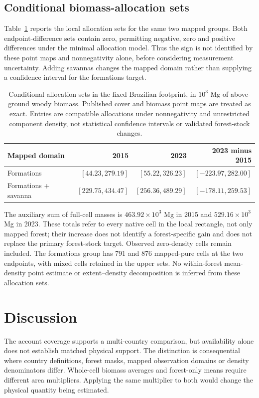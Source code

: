\documentclass[11pt,a4paper]{article}
\begin{document}
\subsection{Conditional biomass-allocation sets}
Table~\ref{tab:allocation} reports the local allocation sets for the same two mapped groups. Both endpoint-difference sets contain zero, permitting negative, zero and positive differences under the minimal allocation model. Thus the sign is not identified by these point maps and nonnegativity alone, before considering measurement uncertainty. Adding savannas changes the mapped domain rather than supplying a confidence interval for the formations target.

\begin{table}[htbp]
\centering\small
\caption{Conditional allocation sets in the fixed Brazilian footprint, in $10^3$ Mg of above-ground woody biomass. Published cover and biomass point maps are treated as exact. Entries are compatible allocations under nonnegativity and unrestricted component density, not statistical confidence intervals or validated forest-stock changes.}\label{tab:allocation}
\begin{tabular}{lrrr}
\toprule
Mapped domain & 2015 & 2023 & 2023 minus 2015\\\midrule
Formations & $[44.23, 279.19]$ & $[55.22, 326.23]$ & $[-223.97, 282.00]$ \\
Formations + savanna & $[229.75, 434.47]$ & $[256.36, 489.29]$ & $[-178.11, 259.53]$ \\
\bottomrule
\end{tabular}
\end{table}

The auxiliary sum of full-cell masses is $463.92\times10^3$ Mg in 2015 and $529.16\times10^3$ Mg in 2023. These totals refer to every native cell in the local rectangle, not only mapped forest; their increase does not identify a forest-specific gain and does not replace the primary forest-stock target. Observed zero-density cells remain included. The formations group has 791 and 876 mapped-pure cells at the two endpoints, with mixed cells retained in the upper sets. No within-forest mean-density point estimate or extent--density decomposition is inferred from these allocation sets.

\section{Discussion}
The account coverage supports a multi-country comparison, but availability alone does not establish matched physical support. The distinction is consequential where country definitions, forest masks, mapped observation domains or density denominators differ. Whole-cell biomass averages and forest-only means require different area multipliers. Applying the same multiplier to both would change the physical quantity being estimated.
\end{document}
